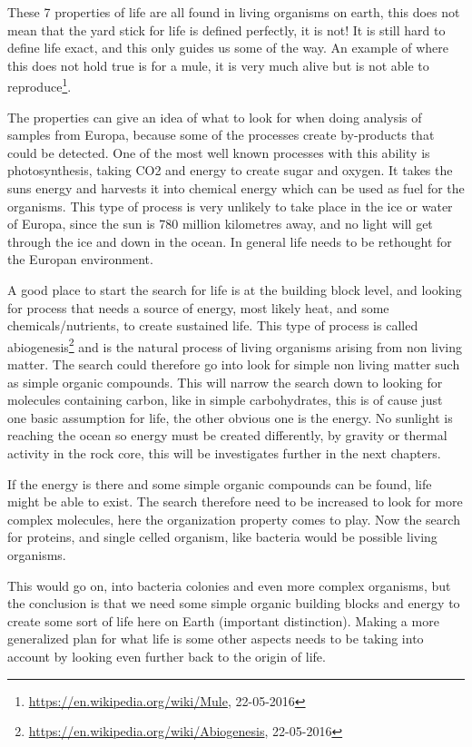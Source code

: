 These 7 properties of life are all found in living organisms on earth, this does not mean that the yard stick for life is defined perfectly, it is not! It is still hard to define life exact, and this only guides us some of the way. An example of where this does not hold true is for a mule, it is very much alive but is not able to reproduce\footnote{\url{https://en.wikipedia.org/wiki/Mule}, 22-05-2016}.

The properties can give an idea of what to look for when doing analysis of samples from Europa, because some of the processes create by-products that could be detected. One of the most well known processes with this ability is photosynthesis, taking CO2 and energy to create sugar and oxygen. It takes the suns energy and harvests it into chemical energy which can be used as fuel for the organisms. This type of process is very unlikely to take place in the ice or water of Europa, since the sun is 780 million kilometres away, and no light will get through the ice and down in the ocean. In general life needs to be rethought for the Europan environment.

A good place to start the search for life is at the building block level, and looking for process that needs a source of energy, most likely heat, and some chemicals/nutrients, to create sustained life. This type of process is called abiogenesis\footnote{\url{https://en.wikipedia.org/wiki/Abiogenesis}, 22-05-2016} and is the natural process of living organisms arising from non living matter. The search could therefore go into look for simple non living matter such as simple organic compounds. This will narrow the search down to looking for molecules containing carbon, like in simple carbohydrates, this is of cause just one basic assumption for life, the other obvious one is the energy. No sunlight is reaching the ocean so energy must be created differently, by gravity or thermal activity in the rock core, this will be investigates further in the next chapters.

If the energy is there and some simple organic compounds can be found, life might be able to exist. The search therefore need to be increased to look for more complex molecules, here the organization property comes to play.  Now the search for proteins, and single celled organism, like bacteria would be possible living organisms.

This would go on, into bacteria colonies and even more complex organisms, but the conclusion is that we need some simple organic building blocks and energy to create some sort of life here on Earth (important distinction). Making a more generalized plan for what life is some other aspects needs to be taking into account by looking even further back to the origin of life.

